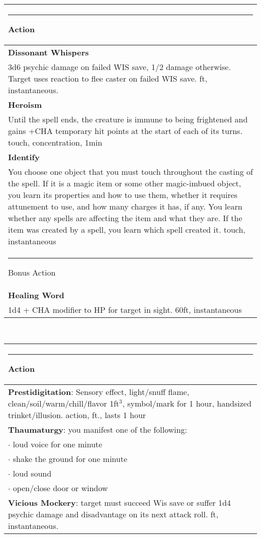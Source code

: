 \documentclass[twocolumn]{article}
\begin{document}
\\
\noindent\begin{tabular}{|m{3.1in}|}
\hline
\rule{1.25in}{0pt}Action\\
\hline
\textbf{Dissonant Whispers}\\
3d6 psychic damage on failed WIS save, 1/2 damage otherwise. Target uses reaction to flee caster on failed WIS save.  {\sc 60 ft, instantaneous}.\\
\textbf{Heroism}\\
Until the spell ends, the creature is immune to being frightened and gains +CHA temporary hit points at the start of each of its turns. {\sc touch, concentration, 1min}\\
\textbf{Identify}\\
You choose one object that you must touch throughout the casting of the spell. If it is a magic item or some other magic-imbued object, you learn its properties and how to use them, whether it requires attunement to use, and how many charges it has, if any. You learn whether any spells are affecting the item and what they are. If the item was created by a spell, you learn which spell created it. {\sc touch, instantaneous}\\
\hline
\rule{1.1in}{0pt}Bonus Action\\
\hline
\textbf{Healing Word}\\
1d4  + CHA modifier to HP for target in sight. {\sc 60ft, instantaneous}\\
\hline
\end{tabular}
\vspace{8pt}

\\
\noindent\begin{tabular}{|m{3.1in}|}
\hline
\rule{1.25in}{0pt}Action\\
\hline
\textbf{Prestidigitation}: Sensory effect, light/snuff flame, clean/soil/warm/chill/flavor 1ft$^3$, symbol/mark for 1 hour, handsized trinket/illusion.  {\sc action, \sc 10 ft., lasts 1 hour}\\
\hline
\textbf{Thaumaturgy}: you manifest one of the following: \\
$\cdot$ loud voice for one minute \\
$\cdot$ shake the ground for one minute \\
$\cdot$ loud sound \\
$\cdot$ open/close door or window \\
\hline
\textbf{Vicious Mockery}: target must succeed Wis save or suffer 1d4 psychic damage and disadvantage on its next attack roll. {\sc 60 ft, instantaneous.}\\
\hline
\end{tabular}
\vspace{8pt}
\end{document}
